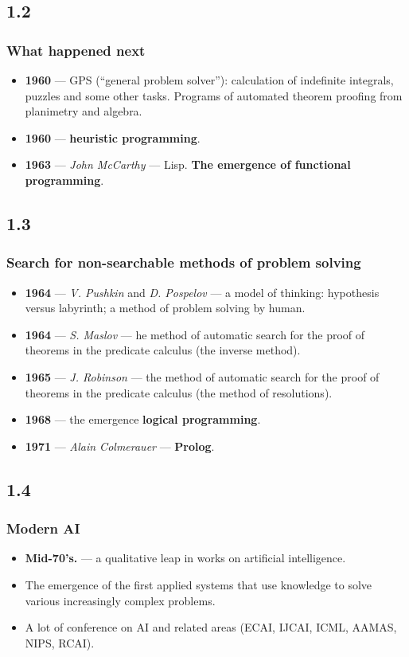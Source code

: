 \documentclass[default]{beamer}
\begin{document}
	\subsection{1.2}
	\begin{frame}
	\frametitle{What happened next}
	
		\begin{itemize}
			\item \textbf{1960}  --- GPS (``general problem solver''): calculation of indefinite integrals, puzzles and some other tasks.  Programs of automated theorem proofing from planimetry and algebra. 
			\item \textbf{1960} --- \textbf{heuristic programming}. 
			\item \textbf{1963} --- \textit{John McCarthy} --- Lisp. \textbf{The emergence of functional programming}.
		\end{itemize}
	\end{frame}
	\subsection{1.3}
	\begin{frame}
		\frametitle{Search for non-searchable methods of problem solving}
		
		\begin{itemize}
			\item \textbf{1964} --- \textit{V. Pushkin} and \textit{D. Pospelov}  --- a model of thinking: hypothesis versus labyrinth; a method of problem solving by human. 
			\item \textbf{1964} --- \textit{S. Maslov} --- he method of automatic search for the proof of theorems in the predicate calculus (the inverse method).
			\item \textbf{1965} --- \textit{J. Robinson} --- the method of automatic search for the proof of theorems in the predicate calculus (the method of resolutions).
			\item \textbf{1968} --- the emergence \textbf{logical programming}.
			\item \textbf{1971} --- \textit{Alain Colmerauer} --- \textbf{Prolog}.
			
		\end{itemize}
	\end{frame}

	\subsection{1.4}
	\begin{frame}
		\frametitle{Modern AI}
		\Large
		\begin{itemize}
			\item \textbf{Mid-70's.} --- a qualitative leap in works on artificial intelligence.
			\item The emergence of the first applied systems that use knowledge to solve various increasingly complex problems.
			\item A lot of conference on AI and related areas (ECAI, IJCAI, ICML, AAMAS, NIPS, RCAI).
		\end{itemize}
	\end{frame}
\end{document}
